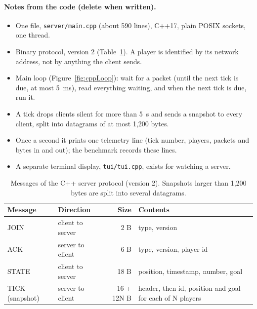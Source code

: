\paragraph{Notes from the code (delete when written).}
\begin{itemize}
\item One file, \texttt{server/main.cpp} (about 590 lines), C++17, plain POSIX sockets, one thread.
\item Binary protocol, version 2 (Table~\ref{tab:packets}). A player is identified by its network address, not by anything the client sends.
\item Main loop (Figure~\ref{fig:cppLoop}): wait for a packet (until the next tick is due, at most 5~ms), read everything waiting, and when the next tick is due, run it.
\item A tick drops clients silent for more than 5~s and sends a snapshot to every client, split into datagrams of at most 1,200 bytes.
\item Once a second it prints one telemetry line (tick number, players, packets and bytes in and out); the benchmark records these lines.
\item A separate terminal display, \texttt{tui/tui.cpp}, exists for watching a server.
\end{itemize}

\begin{table}[H]
\centering
\small
\begin{tabular}{@{}llrl@{}}
\toprule
Message & Direction & Size & Contents \\
\midrule
JOIN & client to server & 2 B & type, version \\
ACK & server to client & 6 B & type, version, player id \\
STATE & client to server & 18 B & position, timestamp, number, goal \\
TICK (snapshot) & server to client & 16 + 12N B & header, then id, position and goal for each of N players \\
\bottomrule
\end{tabular}
\caption{Messages of the C++ server protocol (version 2). Snapshots larger than 1,200 bytes are split into several datagrams.}
\label{tab:packets}
\end{table}

